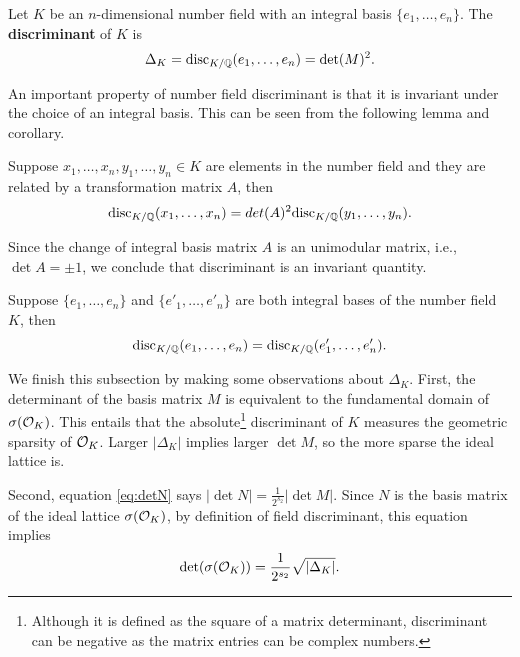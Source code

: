 \documentclass[../main.tex]{subfiles}
\begin{document}
\begin{definition}
Let $K$ be an $n$-dimensional number field with an integral basis $\{e_1, \dots, e_n\}$. 
The \textbf{discriminant} \reversemarginpar{}
of $K$ is 
\begin{equation*}
	\Delta_K = \text{disc}_{K/\mathbb{Q}}(e_1, \dots, e_n) = \det (M)^2.
\end{equation*}
\end{definition}

An important property of number field discriminant is that it is invariant under the choice of an integral basis. This can be seen from the following lemma and corollary. 

\begin{lemma}
Suppose  $x_1, \dots, x_n, y_1, \dots, y_n \in K$ are elements in the number field and they are related by a transformation matrix $A$, then 
\begin{equation*}
    \text{disc}_{K / \mathbb{Q}}(x_1, \dots, x_n) = det (A)^2 \text{disc}_{K / \mathbb{Q}}(y_1, \dots, y_n).
\end{equation*}
\end{lemma}

Since the change of integral basis matrix $A$ is an unimodular matrix, i.e., $\det A = \pm 1$, we conclude that discriminant is an invariant quantity. 
\begin{corollary}
\reversemarginpar
{}
Suppose $\{e_1, \dots, e_n\}$ and $\{e'_1, \dots, e'_n\}$ are both integral bases of the number field $K$, then 
\begin{equation*}
    \text{disc}_{K / \mathbb{Q}}(e_1, \dots, e_n) =  \text{disc}_{K / \mathbb{Q}}(e'_1, \dots, e'_n).
\end{equation*}
\end{corollary}

We finish this subsection by making some observations about $\Delta_K$. First, the determinant of the basis matrix $M$ is equivalent to the fundamental domain of $\sigma(\mathcal{O}_K)$. This entails that the absolute\footnote{Although it is defined as the square of a matrix determinant, discriminant can be negative as the matrix entries can be complex numbers.} discriminant of $K$ measures the geometric sparsity of $\mathcal{O}_K$. Larger $|\Delta_K|$ implies larger $\det M$, so the more sparse the ideal lattice is. 

Second, equation \ref{eq:detN} says $|\det N| = \frac{1}{2^{s_2}} |\det M|$. Since $N$ is the basis matrix of the ideal lattice $\sigma(\mathcal{O}_K)$, by definition of field discriminant, this equation implies 
\begin{align}
\label{eq:detOK}
    \det (\sigma(\mathcal{O}_K)) = \frac{1}{2^{s_2}} \sqrt{|\Delta_K|}.
\end{align}
\end{document}
